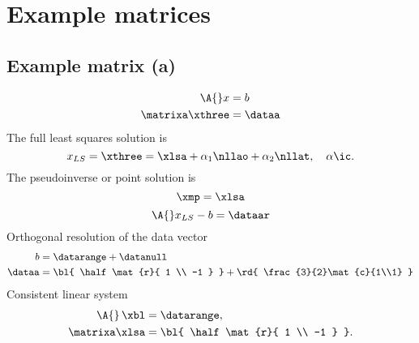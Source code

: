 \section{Example matrices}

\subsection{Example matrix (a)}
%
\begin{equation}
  \begin{split}
    \A{} x &= b \\
    \matrixa \xthree &= \dataa
  \end{split}
\end{equation}
%
The full least squares solution is
%
\begin{equation}
  x_{LS} = \xthree = \xlsa + \alpha_{1} \nllao  + \alpha_{2} \nllat, \quad \alpha\ic.
\end{equation}
%
The pseudoinverse or point solution is
%
\begin{equation}
  \xmp = \xlsa
\end{equation}
%
\begin{equation}
  \A{}x_{LS} - b = \dataar
\end{equation}
%
Orthogonal resolution of the data vector
%
\begin{equation}
  \begin{split}
     b &= \datarange + \datanull \\
     \dataa &= {\bl{ \half \mat{r}{ 1 \\ -1 } }} + {\rd{ \frac{3}{2}\mat{c}{1\\1} }}
  \end{split}
\end{equation}
%
Consistent linear system
\begin{equation}
  \begin{split}
    \A{}\, \xbl &= \datarange, \\
    \matrixa \xlsa &= {\bl{ \half \mat{r}{ 1 \\ -1 } }} .
  \end{split}
\end{equation}



